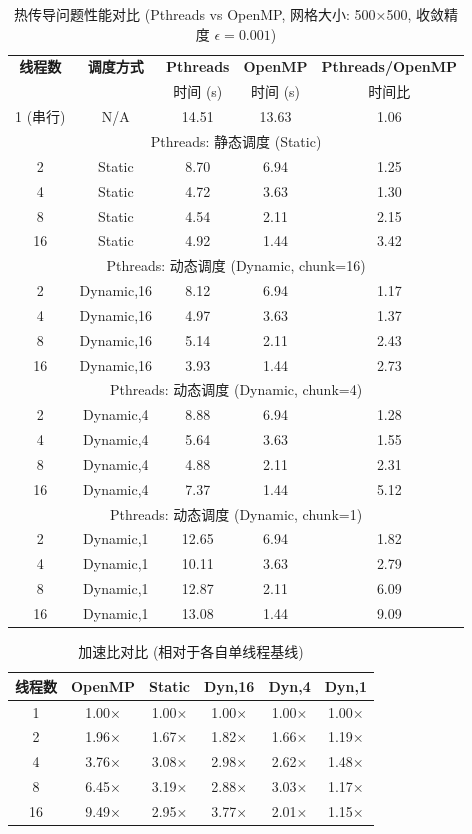 \documentclass{SYSUReport}
\begin{document}
\begin{table}[h!]
\centering
\caption{热传导问题性能对比 (Pthreads vs OpenMP, 网格大小: 500×500, 收敛精度 $\epsilon=0.001$)}
\begin{tabular}{|c|c|c|c|c|}
\hline
\textbf{线程数} & \textbf{调度方式} & \textbf{Pthreads} & \textbf{OpenMP} & \textbf{Pthreads/OpenMP} \\
 &  & 时间 (s) & 时间 (s) & 时间比 \\
\hline
1 (串行) & N/A & 14.51 & 13.63 & 1.06 \\
\hline
\multicolumn{5}{|c|}{Pthreads: 静态调度 (Static)} \\
\hline
2 & Static & 8.70 & 6.94 & 1.25 \\
4 & Static & 4.72 & 3.63 & 1.30 \\
8 & Static & 4.54 & 2.11 & 2.15 \\
16 & Static & 4.92 & 1.44 & 3.42 \\
\hline
\multicolumn{5}{|c|}{Pthreads: 动态调度 (Dynamic, chunk=16)} \\
\hline
2 & Dynamic,16 & 8.12 & 6.94 & 1.17 \\
4 & Dynamic,16 & 4.97 & 3.63 & 1.37 \\
8 & Dynamic,16 & 5.14 & 2.11 & 2.43 \\
16 & Dynamic,16 & 3.93 & 1.44 & 2.73 \\
\hline
\multicolumn{5}{|c|}{Pthreads: 动态调度 (Dynamic, chunk=4)} \\
\hline
2 & Dynamic,4 & 8.88 & 6.94 & 1.28 \\
4 & Dynamic,4 & 5.64 & 3.63 & 1.55 \\
8 & Dynamic,4 & 4.88 & 2.11 & 2.31 \\
16 & Dynamic,4 & 7.37 & 1.44 & 5.12 \\
\hline
\multicolumn{5}{|c|}{Pthreads: 动态调度 (Dynamic, chunk=1)} \\
\hline
2 & Dynamic,1 & 12.65 & 6.94 & 1.82 \\
4 & Dynamic,1 & 10.11 & 3.63 & 2.79 \\
8 & Dynamic,1 & 12.87 & 2.11 & 6.09 \\
16 & Dynamic,1 & 13.08 & 1.44 & 9.09 \\
\hline
\end{tabular}
\label{tab:performance_comparison}
\end{table}

\begin{table}[h!]
\centering
\caption{加速比对比 (相对于各自单线程基线)}
\begin{tabular}{|c|c|c|c|c|c|}
\hline
\textbf{线程数} & \textbf{OpenMP} & \textbf{Static} & \textbf{Dyn,16} & \textbf{Dyn,4} & \textbf{Dyn,1} \\
\hline
1 & 1.00× & 1.00× & 1.00× & 1.00× & 1.00× \\
2 & 1.96× & 1.67× & 1.82× & 1.66× & 1.19× \\
4 & 3.76× & 3.08× & 2.98× & 2.62× & 1.48× \\
8 & 6.45× & 3.19× & 2.88× & 3.03× & 1.17× \\
16 & 9.49× & 2.95× & 3.77× & 2.01× & 1.15× \\
\hline
\end{tabular}
\label{tab:speedup}
\end{table}
\end{document}
